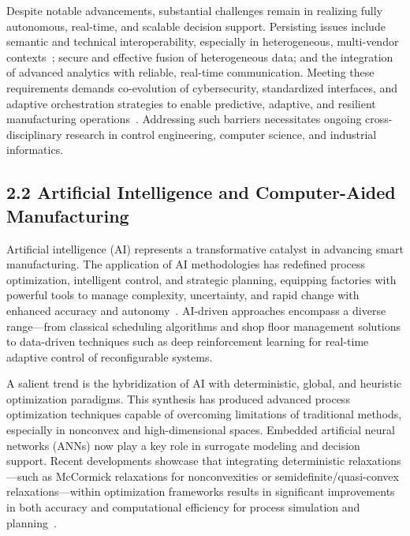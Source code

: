 \documentclass[11pt]{article}
\begin{document}
Despite notable advancements, substantial challenges remain in realizing fully autonomous, real-time, and scalable decision support. Persisting issues include semantic and technical interoperability, especially in heterogeneous, multi-vendor contexts~\cite{ref25}; secure and effective fusion of heterogeneous data; and the integration of advanced analytics with reliable, real-time communication. Meeting these requirements demands co-evolution of cybersecurity, standardized interfaces, and adaptive orchestration strategies to enable predictive, adaptive, and resilient manufacturing operations~\cite{ref4,ref91}. Addressing such barriers necessitates ongoing cross-disciplinary research in control engineering, computer science, and industrial informatics.

\subsection{2.2 Artificial Intelligence and Computer-Aided Manufacturing}

Artificial intelligence (AI) represents a transformative catalyst in advancing smart manufacturing. The application of AI methodologies has redefined process optimization, intelligent control, and strategic planning, equipping factories with powerful tools to manage complexity, uncertainty, and rapid change with enhanced accuracy and autonomy~\cite{ref2,ref6,ref13,ref14,ref19,ref20,ref27,ref30,ref37,ref38,ref41,ref42,ref44,ref45,ref50,ref52,ref56,ref72,ref91}. AI-driven approaches encompass a diverse range—from classical scheduling algorithms and shop floor management solutions to data-driven techniques such as deep reinforcement learning for real-time adaptive control of reconfigurable systems.

A salient trend is the hybridization of AI with deterministic, global, and heuristic optimization paradigms. This synthesis has produced advanced process optimization techniques capable of overcoming limitations of traditional methods, especially in nonconvex and high-dimensional spaces. Embedded artificial neural networks (ANNs) now play a key role in surrogate modeling and decision support. Recent developments showcase that integrating deterministic relaxations—such as McCormick relaxations for nonconvexities or semidefinite/quasi-convex relaxations—within optimization frameworks results in significant improvements in both accuracy and computational efficiency for process simulation and planning~\cite{ref71,ref72,ref73,ref76,ref78}.
\end{document}
